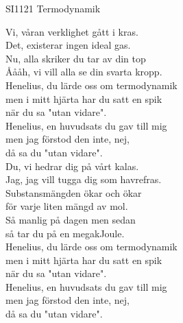 \documentclass[a6paper,10pt]{article}
\begin{document}
\setlength{\oddsidemargin}{-0.47in}
\noindent
\begin{center}
\footnotesize SI1121 Termodynamik\\
\end{center}
\begin{lyrics}
Vi, våran verklighet gått i kras. \\
Det, existerar ingen ideal gas. \\
Nu, alla skriker du tar av din top \\
Åååh, vi vill alla se din svarta kropp.
\vspace{5pt} \\
Henelius, du lärde oss om termodynamik \\
men i mitt hjärta har du satt en spik \\
när du sa "utan vidare".
\vspace{5pt} \\
Henelius, en huvudsats du gav till mig \\
men jag förstod den inte, nej, \\
då sa du "utan vidare".
\vspace{5pt} \\
Du, vi hedrar dig på vårt kalas. \\
Jag, jag vill tugga dig som havrefras. \\
Substansmängden ökar och ökar \\
för varje liten mängd av mol.  \\
Så manlig på dagen men sedan \\
så tar du på en megakJoule.
\vspace{5pt} \\
Henelius, du lärde oss om termodynamik \\
men i mitt hjärta har du satt en spik \\
när du sa "utan vidare".
\vspace{5pt} \\
Henelius, en huvudsats du gav till mig \\
men jag förstod den inte, nej, \\
då sa du "utan vidare".
\end{lyrics}
\end{document}
